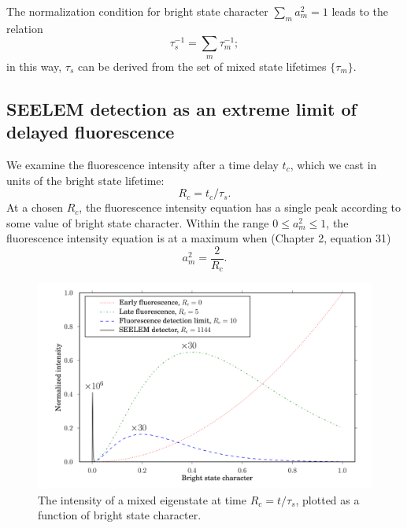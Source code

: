 \documentclass[12pt]{mitthesis}
\begin{document}
The normalization condition for bright state character $\sum_m a_m^2 =
1$ leads to the relation
\begin{equation}
  \tau_s^{-1} = \sum_m \tau_m^{-1};
\end{equation}
in this way, $\tau_s$ can be derived from the set of mixed state
lifetimes $\lbrace \tau_m \rbrace$.

\subsection{SEELEM detection as an extreme limit of delayed fluorescence}

We examine the fluorescence intensity after a time delay $t_c$,
which we cast in units of the bright state lifetime:
\begin{equation}
  R_c = t_c / \tau_s.
\end{equation}
At a chosen $R_c$, the fluorescence intensity equation has a single
peak according to some value of bright state character.  Within the
range $0 \le a_m^2 \le 1$, the fluorescence intensity equation is at a
maximum when (Chapter 2, equation 31)
\begin{equation}
  \label{eq:am-max}
  a_m^2 = \frac{2}{R_c}.
\end{equation}

\begin{figure}
  \caption{The intensity of a mixed eigenstate at time $R_c =
    t/\tau_s$, plotted as a function of bright
    state character.}
  \label{fig:int-at-rc}
  \centering
  \includegraphics[width=7.5in,angle=90]{intensity-at-rc.png}
\end{figure}
\end{document}

